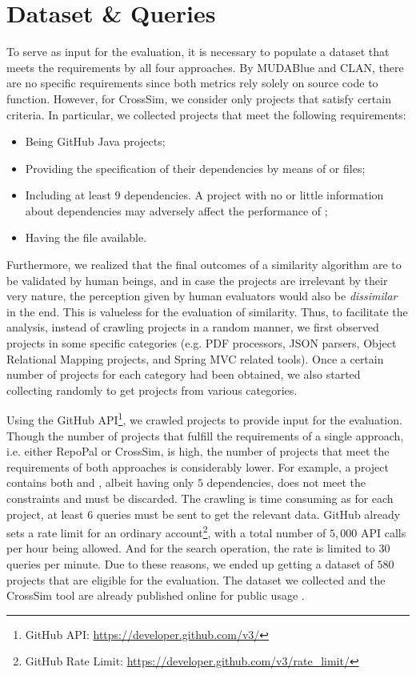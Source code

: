 \section{Dataset \& Queries} \label{sec:Dataset}

To serve as input for the evaluation, it is necessary to populate a dataset that meets the requirements by all four approaches. By MUDABlue and CLAN, there are no specific requirements since both metrics rely solely on source code to function. However, for CrossSim, we consider only projects that satisfy certain criteria. In particular, we collected projects that meet the following requirements:

\begin{itemize}
	\item Being GitHub Java projects; 
	\item Providing the specification of their dependencies by means of  or  files;
	\item Including at least $9$ dependencies. A project with no or little information about dependencies may adversely affect the performance of \CrossSim; 
	\item Having the  file available.
\end{itemize}

Furthermore, we realized that the final outcomes of a similarity algorithm are to be validated by human beings, and in case the projects are irrelevant by their very nature, the perception given by human evaluators would also be \emph{dissimilar} in the end. This is valueless for the evaluation of similarity. Thus, to facilitate the analysis, instead of crawling projects in a random manner, we first observed projects in some specific categories (e.g. PDF processors, JSON parsers, Object Relational Mapping projects, and Spring MVC related tools). Once a certain number of projects for each category had been obtained, we also started collecting randomly to get projects from various categories.

Using the GitHub API\footnote{GitHub API: \url{https://developer.github.com/v3/}}, we crawled projects to provide input for the evaluation. Though the number of projects that fulfill the requirements of a single approach, i.e. either RepoPal or CrossSim, is high, the number of projects that meet the requirements of both approaches is considerably lower. For example, a project contains both  and , albeit having only $5$ dependencies, does not meet the constraints and must be discarded. The crawling is time consuming as for each project, at least $6$ queries must be sent to get the relevant data. GitHub already sets a rate limit for an ordinary account\footnote{GitHub Rate Limit: \url{https://developer.github.com/v3/rate_limit/}}, with a total number of $5,000$ API calls per hour being allowed. And for the search operation, the rate is limited to $30$ queries per minute. Due to these reasons, we ended up getting a dataset of $580$ projects that are eligible for the evaluation. The dataset we collected and the CrossSim tool are already published online for public usage \cite{CROSSSIM-DATA}.

